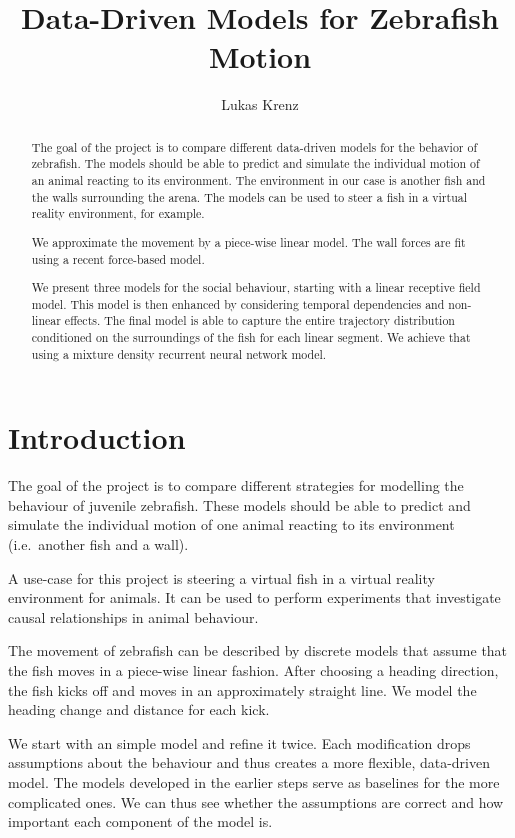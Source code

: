 \documentclass[nobib]{tufte-handout}
\title{Data-Driven Models for Zebrafish Motion}
\author[Lukas Krenz]{Lukas Krenz}
\begin{document}
\maketitle%

\begin{abstract}
\noindent
The goal of the project is to compare different data-driven models for the behavior of zebrafish.
The models should be able to predict and simulate the individual motion of an animal reacting to its environment.
The environment in our case is another fish and the walls surrounding the arena.
The models can be used to steer a fish in a virtual reality environment, for example.

We approximate the movement by a piece-wise linear model.
The wall forces are fit using a recent force-based model.

We present three models for the social behaviour, starting with a linear receptive field model.
This model is then enhanced by considering temporal dependencies and non-linear effects.
The final model is able to capture the entire trajectory distribution conditioned on the surroundings of the fish for each linear segment.
We achieve that using a mixture density recurrent neural network model.
\end{abstract}

\section{Introduction}
The goal of the project is to compare different strategies for modelling the behaviour of juvenile zebrafish.
These models should be able to predict and simulate the individual motion of one animal reacting to its environment (i.e.\ another fish and a wall).

A use-case for this project is steering a virtual fish in a virtual reality environment for animals.
It can be used to perform experiments that investigate causal relationships in animal behaviour.

The movement of zebrafish can be described by discrete models that assume that the fish moves in a piece-wise linear fashion.
After choosing a heading direction, the fish kicks off and moves in an approximately straight line.
We model the heading change and distance for each kick.

We start with an simple model and refine it twice.
Each modification drops assumptions about the behaviour and thus creates a more flexible, data-driven model.
The models developed in the earlier steps serve as baselines for the more complicated ones.
We can thus see whether the assumptions are correct and how important each component of the model is.
\end{document}
